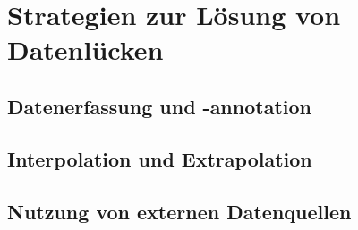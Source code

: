 \section{Strategien zur Lösung von Datenlücken}\label{sec:data-gaps}

\subsection{Datenerfassung und -annotation}\label{sec:data-gaps-acquisition}

\subsection{Interpolation und Extrapolation}\label{sec:data-gaps-interpolation}

\subsection{Nutzung von externen Datenquellen}\label{sec:data-gaps-external-sources}
